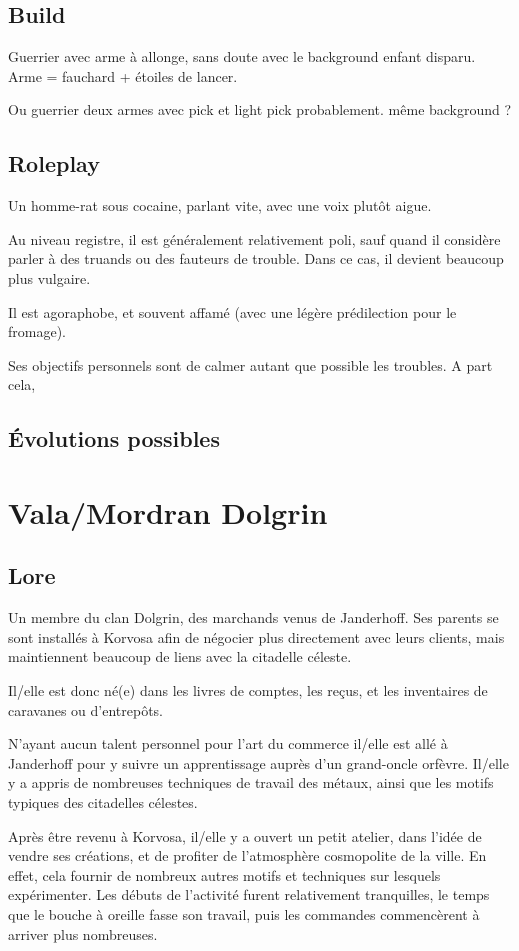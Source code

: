 \documentclass[10pt,a4paper]{book}
\begin{document}
\subsection{Build}
Guerrier avec arme à allonge, sans doute avec le background enfant disparu. Arme = fauchard + étoiles de lancer.

Ou guerrier deux armes avec pick et light pick probablement. même background ?
\subsection{Roleplay}
Un homme-rat sous cocaine, parlant vite, avec une voix plutôt aigue.

Au niveau registre, il est généralement relativement poli, sauf quand il considère parler à des truands ou des fauteurs de trouble. Dans ce cas, il devient beaucoup plus vulgaire.

Il est agoraphobe, et souvent affamé (avec une légère prédilection pour le fromage).

Ses objectifs personnels sont de calmer autant que possible les troubles. A part cela, 
\subsection{Évolutions possibles}

\section{Vala/Mordran Dolgrin}
\subsection{Lore}
Un membre du clan Dolgrin, des marchands venus de Janderhoff. Ses parents se sont installés à Korvosa afin de négocier plus directement avec leurs clients, mais maintiennent beaucoup de liens avec la citadelle céleste.

Il/elle est donc né(e) dans les livres de comptes, les reçus, et les inventaires de caravanes ou d'entrepôts.

N'ayant aucun talent personnel pour l'art du commerce il/elle est allé à Janderhoff pour y suivre un apprentissage auprès d'un grand-oncle orfèvre. Il/elle y a appris de nombreuses techniques de travail des métaux, ainsi que les motifs typiques des citadelles célestes.

Après être revenu à Korvosa, il/elle y a ouvert un petit atelier, dans l'idée de vendre ses créations, et de profiter de l'atmosphère cosmopolite de la ville. En effet, cela fournir de nombreux autres motifs et techniques sur lesquels expérimenter. Les débuts de l'activité furent relativement tranquilles, le temps que le bouche à oreille fasse son travail, puis les commandes commencèrent à arriver plus nombreuses.
\end{document}
